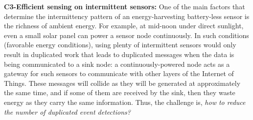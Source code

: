 \noindent\textbf{C3-Efficient sensing on intermittent sensors:} 
One of the main factors that determine the intermittency pattern of an energy-harvesting battery-less sensor is the richness of ambient energy. 
For example, at mid-noon under direct sunlight, even a small solar panel can power a sensor node continuously. 
In such conditions (favorable energy conditions), using plenty of intermittent sensors would only result in duplicated work that leads to duplicated messages when the data is being communicated to a sink node: a continuously-powered node acts as a gateway for such sensors to communicate with other layers of the Internet of Things. These messages will collide as they will be generated at approximately the same time, and if some of them are received by the sink, then they waste energy as they carry the same information. Thus, the challenge is, \emph{how to reduce the number of duplicated event detections?} 
%
